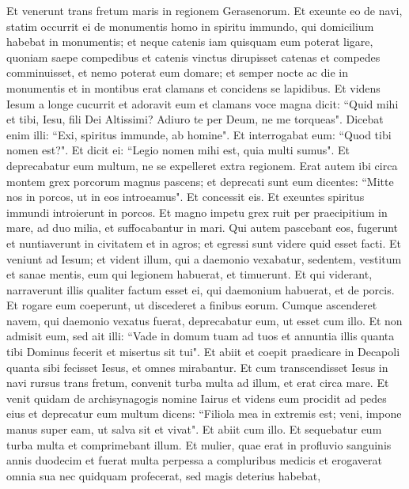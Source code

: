\begin{biblechapter}  
\verse Et venerunt trans fretum maris in regionem Gerasenorum. 
\verse Et exeunte eo de navi, statim occurrit ei de monumentis homo in spiritu immundo, 
\verse qui domicilium habebat in monumentis; et neque catenis iam quisquam eum poterat ligare, 
\verse quoniam saepe compedibus et catenis vinctus dirupisset catenas et compedes comminuisset, et nemo poterat eum domare; 
\verse et semper nocte ac die in monumentis et in montibus erat clamans et concidens se lapidibus. 
\verse Et videns Iesum a longe cucurrit et adoravit eum 
\verse et clamans voce magna dicit: “Quid mihi et tibi, Iesu, fili Dei Altissimi? Adiuro te per Deum, ne me torqueas". 
\verse Dicebat enim illi: “Exi, spiritus immunde, ab homine". 
\verse Et interrogabat eum: “Quod tibi nomen est?". Et dicit ei: “Legio nomen mihi est, quia multi sumus". 
\verse Et deprecabatur eum multum, ne se expelleret extra regionem. 
\verse Erat autem ibi circa montem grex porcorum magnus pascens; 
\verse et deprecati sunt eum dicentes: “Mitte nos in porcos, ut in eos introeamus". 
\verse Et concessit eis. Et exeuntes spiritus immundi introierunt in porcos. Et magno impetu grex ruit per praecipitium in mare, ad duo milia, et suffocabantur in mari. 
\verse Qui autem pascebant eos, fugerunt et nuntiaverunt in civitatem et in agros; et egressi sunt videre quid esset facti. 
\verse Et veniunt ad Iesum; et vident illum, qui a daemonio vexabatur, sedentem, vestitum et sanae mentis, eum qui legionem habuerat, et timuerunt. 
\verse Et qui viderant, narraverunt illis qualiter factum esset ei, qui daemonium habuerat, et de porcis. 
\verse Et rogare eum coeperunt, ut discederet a finibus eorum. 
\verse Cumque ascenderet navem, qui daemonio vexatus fuerat, deprecabatur eum, ut esset cum illo. 
\verse Et non admisit eum, sed ait illi: “Vade in domum tuam ad tuos et annuntia illis quanta tibi Dominus fecerit et misertus sit tui". 
\verse Et abiit et coepit praedicare in Decapoli quanta sibi fecisset Iesus, et omnes mirabantur. 
\verse Et cum transcendisset Iesus in navi rursus trans fretum, convenit turba multa ad illum, et erat circa mare. 
\verse Et venit quidam de archisynagogis nomine Iairus et videns eum procidit ad pedes eius 
\verse et deprecatur eum multum dicens: “Filiola mea in extremis est; veni, impone manus super eam, ut salva sit et vivat". 
\verse Et abiit cum illo. Et sequebatur eum turba multa et comprimebant illum. 
\verse Et mulier, quae erat in profluvio sanguinis annis duodecim 
\verse et fuerat multa perpessa a compluribus medicis et erogaverat omnia sua nec quidquam profecerat, sed magis deterius habebat, 

\end{biblechapter}
